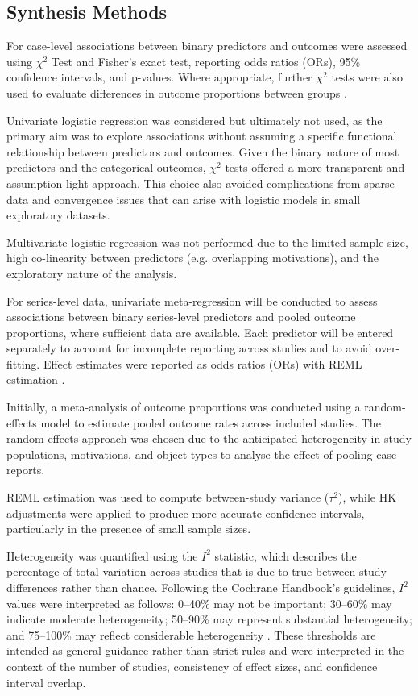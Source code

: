 \subsection{Synthesis Methods}

\noindent For case-level associations between binary predictors and outcomes were assessed using $\chi^2$ Test and Fisher's exact test, reporting odds ratios (ORs), 95\% confidence intervals, and p-values. Where appropriate, further $\chi^2$ tests were also used to evaluate differences in outcome proportions between groups \cite{Machin_2008}. 

Univariate logistic regression was considered but ultimately not used, as the primary aim was to explore associations without assuming a specific functional relationship between predictors and outcomes. Given the binary nature of most predictors and the categorical outcomes, $\chi^2$ tests offered a more transparent and assumption-light approach. This choice also avoided complications from sparse data and convergence issues that can arise with logistic models in small exploratory datasets.

Multivariate logistic regression was not performed due to the limited sample size, high co-linearity between predictors (e.g. overlapping motivations), and the exploratory nature of the analysis. 

For series-level data, univariate meta-regression will be conducted to assess associations between binary series-level predictors and pooled outcome proportions, where sufficient data are available. Each predictor will be entered separately to account for incomplete reporting across studies and to avoid over-fitting. Effect estimates were reported as odds ratios (ORs) with REML estimation \cite{Tanriver-Ayder_2021}.

Initially, a meta-analysis of outcome proportions was conducted using a random-effects model to estimate pooled outcome rates across included studies. The random-effects approach was chosen due to the anticipated heterogeneity in study populations, motivations, and object types to analyse the effect of pooling case reports.

REML estimation was used to compute between-study variance ($\tau^2$), while HK adjustments were applied to produce more accurate confidence intervals, particularly in the presence of small sample sizes.

Heterogeneity was quantified using the $I^2$ statistic, which describes the percentage of total variation across studies that is due to true between-study differences rather than chance. Following the Cochrane Handbook’s guidelines, $I^2$ values were interpreted as follows: 0--40\% may not be important; 30--60\% may indicate moderate heterogeneity; 50--90\% may represent substantial heterogeneity; and 75--100\% may reflect considerable heterogeneity \cite{Sterne_2017}. These thresholds are intended as general guidance rather than strict rules and were interpreted in the context of the number of studies, consistency of effect sizes, and confidence interval overlap.

